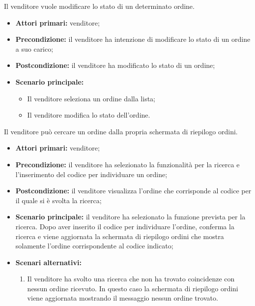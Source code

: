 \label{modifica-stato-ordine}

Il venditore vuole modificare lo stato di un determinato ordine.
\begin{itemize}
	\item \textbf{Attori primari:} venditore;
	\item \textbf{Precondizione:} il venditore ha intenzione di modificare lo stato di un ordine a suo carico;
	\item \textbf{Postcondizione:} il venditore ha modificato lo stato di un ordine;
	\item \textbf{Scenario principale:}
	\begin{itemize}
		\item Il venditore seleziona un ordine dalla lista;
		\item Il venditore modifica lo stato dell'ordine.
	\end{itemize}
\end{itemize}

\label{ricerca-codice-ordine-venditore}

Il venditore può cercare un ordine dalla propria schermata di riepilogo ordini.
\begin{itemize}
	\item \textbf{Attori primari:} venditore;
	\item \textbf{Precondizione:} il venditore ha selezionato la funzionalità per la ricerca e l'inserimento del codice per individuare un ordine;
	\item \textbf{Postcondizione:} il venditore visualizza l'ordine che corrisponde al codice per il quale si è svolta la ricerca;
	\item \textbf{Scenario principale:} il venditore ha selezionato la funzione prevista per la ricerca. Dopo aver inserito il codice per individuare l'ordine, conferma la ricerca e viene aggiornata la schermata di riepilogo ordini che mostra solamente l'ordine corrispondente al codice indicato;
	\item \textbf{Scenari alternativi:}
	\begin{enumerate}[label=\lett]
		\item Il venditore ha svolto una ricerca che non ha trovato coincidenze con nessun ordine ricevuto. In questo caso la schermata di riepilogo ordini viene aggiornata mostrando il messaggio nessun ordine trovato.
	\end{enumerate}
\end{itemize}

